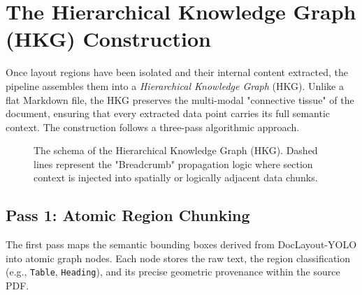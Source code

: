 \section{The Hierarchical Knowledge Graph (HKG) Construction}
\label{sec:hkg_logic}

Once layout regions have been isolated and their internal content extracted, the pipeline assembles them into a \textit{Hierarchical Knowledge Graph} (HKG). Unlike a flat Markdown file, the HKG preserves the multi-modal "connective tissue" of the document, ensuring that every extracted data point carries its full semantic context. The construction follows a three-pass algorithmic approach.

\begin{figure}[htbp]
\centering
{}
\caption{The schema of the Hierarchical Knowledge Graph (HKG). Dashed lines represent the "Breadcrumb" propagation logic where section context is injected into spatially or logically adjacent data chunks.}
\label{fig:hkg_structure}
\end{figure}

\subsection{Pass 1: Atomic Region Chunking}
The first pass maps the semantic bounding boxes derived from DocLayout-YOLO into atomic graph nodes. Each node stores the raw text, the region classification (e.g., \texttt{Table}, \texttt{Heading}), and its precise geometric provenance within the source PDF.

